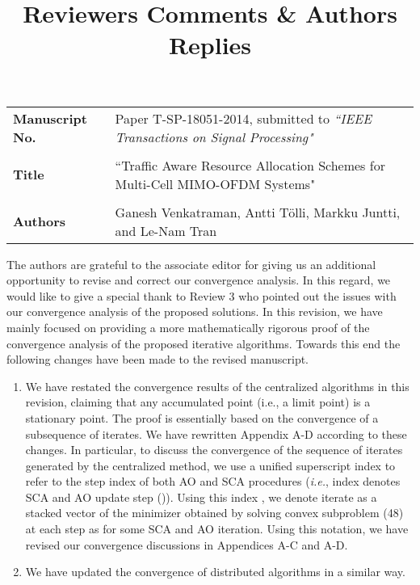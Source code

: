 \documentclass[10pt,letterpaper,onecolumn]{article}
\begin{document}
	
	\title{Reviewers Comments \& Authors Replies}
	
	\date{}
	\maketitle
	
	\begin{tabular}{p{1.25in}p{4.25in}}
		\textbf{Manuscript No.} & Paper T-SP-18051-2014, submitted to \emph{``IEEE Transactions on Signal Processing"} \\ \\
		\textbf{Title} & ``Traffic Aware Resource Allocation Schemes for Multi-Cell MIMO-OFDM Systems" \\ \\
		\textbf{Authors} & Ganesh Venkatraman, Antti T\"{o}lli, Markku Juntti, and Le-Nam Tran
	\end{tabular}
	
	\vspace{0.35in}
	The authors are grateful to the associate editor for giving us an additional opportunity to revise and correct our convergence analysis. In this regard, we would like to give a special thank to Review 3 who pointed out the issues with our convergence analysis of the proposed solutions. In this revision, we have mainly focused on providing a more mathematically rigorous  proof of the convergence analysis of the proposed iterative algorithms.
	Towards this end the following changes have been made to the revised manuscript.
	\begin{enumerate}
		\item We have restated the convergence results of the centralized algorithms in this revision, claiming that any accumulated point (i.e., a limit point) is a stationary point. The proof is essentially based on the convergence of a subsequence of iterates. We have rewritten Appendix A-D according to these changes. In particular, to discuss the convergence of the sequence of iterates generated by the centralized method, we use a unified superscript index  to refer to the step index of both \ac{AO} and \ac{SCA} procedures (\textit{i.e.}, index  denotes \ac{SCA} and \ac{AO} update step ()). Using this index , we denote iterate  as a stacked vector of the minimizer obtained by solving convex subproblem (48) at each step  as  for some \ac{SCA} and \ac{AO} iteration. Using this notation, we have revised our convergence discussions in Appendices A-C and A-D.		
		\item We have updated the convergence of distributed algorithms in a similar way.
	\end{enumerate}
	
\end{document}

